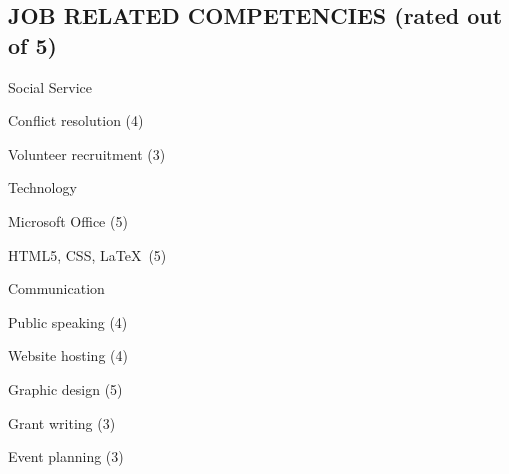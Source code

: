 \documentclass[margin]{res}
\begin{document}
\begin{resume}
\section{JOB RELATED COMPETENCIES (rated out of 5)} \vspace{0pt}
	\begin{multicols}{2}
		\parskip=0pt
		\begin{skill}{Social Service}
			\item Conflict resolution (4)
			\item Volunteer recruitment (3)
		\end{skill}
		\begin{skill}{Technology}
			\item Microsoft Office (5)
			\item HTML5, CSS, \LaTeX\ (5)
		\end{skill}
		\begin{skill}{Communication}
			\item Public speaking (4)
			\item Website hosting (4)
			\item Graphic design (5)
			\item Grant writing (3) %
			\item Event planning (3) %
		\end{skill}
	\end{multicols}

% 




\end{resume}
\end{document}
